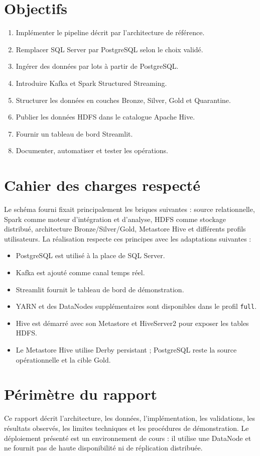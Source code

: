 \documentclass[11pt,a4paper]{report}
\begin{document}
\section{Objectifs}
\begin{enumerate}[leftmargin=*]
\item Implémenter le pipeline décrit par l'architecture de référence.
\item Remplacer SQL Server par PostgreSQL selon le choix validé.
\item Ingérer des données par lots à partir de PostgreSQL.
\item Introduire Kafka et Spark Structured Streaming.
\item Structurer les données en couches Bronze, Silver, Gold et Quarantine.
\item Publier les données HDFS dans le catalogue Apache Hive.
\item Fournir un tableau de bord Streamlit.
\item Documenter, automatiser et tester les opérations.
\end{enumerate}

\section{Cahier des charges respecté}
Le schéma fourni fixait principalement les briques suivantes : source
relationnelle, Spark comme moteur d'intégration et d'analyse, HDFS comme
stockage distribué, architecture Bronze/Silver/Gold, Metastore Hive et
différents profils utilisateurs. La réalisation respecte ces principes
avec les adaptations suivantes :
\begin{itemize}
\item PostgreSQL est utilisé à la place de SQL Server.
\item Kafka est ajouté comme canal temps réel.
\item Streamlit fournit le tableau de bord de démonstration.
\item YARN et des DataNodes supplémentaires sont disponibles dans le profil \texttt{full}.
\item Hive est démarré avec son Metastore et HiveServer2 pour exposer les tables HDFS.
\item Le Metastore Hive utilise Derby persistant ; PostgreSQL reste la source opérationnelle et la cible Gold.
\end{itemize}

\section{Périmètre du rapport}
Ce rapport décrit l'architecture, les données, l'implémentation, les validations,
les résultats observés, les limites techniques et les procédures de démonstration.
Le déploiement présenté est un environnement de cours : il utilise une DataNode
et ne fournit pas de haute disponibilité ni de réplication distribuée.
\end{document}
